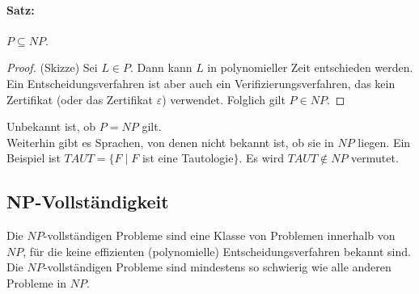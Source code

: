 \paragraph{Satz:} $P \subseteq NP$.
\begin{proof}
(Skizze) Sei $L \in P$. Dann kann $L$ in polynomieller Zeit entschieden werden. Ein Entscheidungsverfahren ist aber auch ein Verifizierungsverfahren, das kein Zertifikat (oder das Zertifikat $\varepsilon$) verwendet. Folglich gilt $P \in NP$.
\end{proof}
Unbekannt ist, ob $P=NP$ gilt.\\
Weiterhin gibt es Sprachen, von denen nicht bekannt ist, ob sie in $NP$ liegen. Ein Beispiel ist $TAUT=\{F\;|\; F$ ist eine Tautologie$\}$. Es wird $TAUT \not \in NP$ vermutet.

\subsection{NP-Vollständigkeit}
Die $NP$-vollständigen Probleme sind eine Klasse von Problemen innerhalb von $NP$, für die keine effizienten (polynomielle) Entscheidungsverfahren bekannt sind. Die $NP$-vollständigen Probleme sind mindestens so schwierig wie alle anderen Probleme in $NP$.

